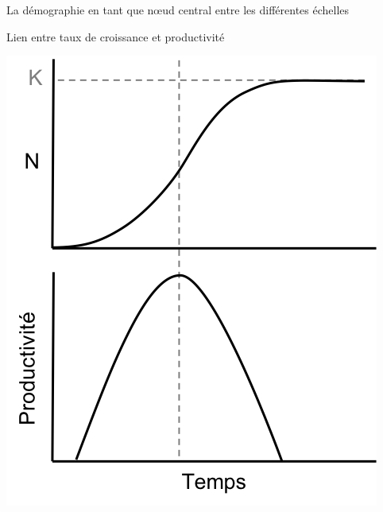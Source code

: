 \documentclass[11pt, compress, aspectratio=1610]{beamer}
\newcommand{\begincols}{\begin{columns}}
\begin{document}
\begin{frame}{La démographie en tant que nœud central entre les
différentes échelles}
\begin{frame}{Lien entre taux de croissance et productivité}
\protect\hypertarget{lien-entre-taux-de-croissance-et-productivituxe9}{}

\centering

\includegraphics[scale=0.7]{figures/productivite.png}

\par

\end{frame}

\end{frame}
\end{document}
